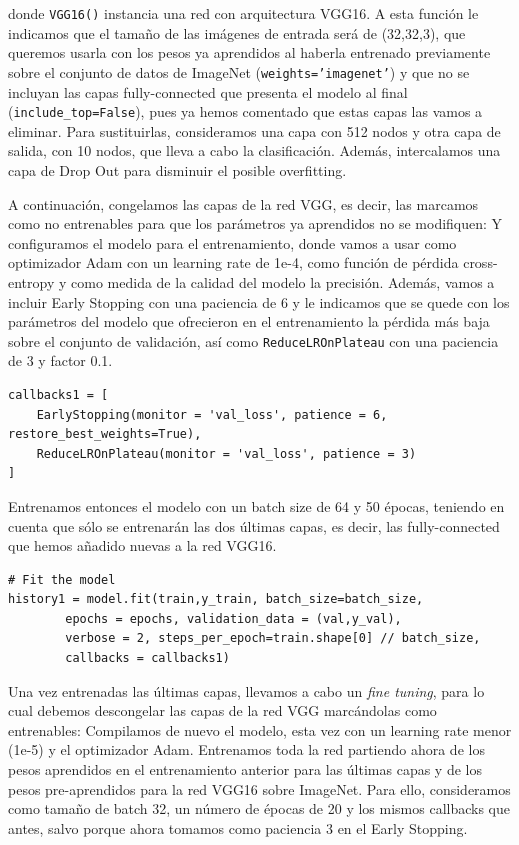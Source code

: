 \documentclass[a4paper,11pt]{article}
\begin{document}
donde \texttt{VGG16()} instancia una red con arquitectura VGG16. A esta función le indicamos que el tamaño de las imágenes de entrada será de (32,32,3), que queremos usarla con los pesos ya aprendidos al haberla entrenado previamente sobre el conjunto de datos de ImageNet (\texttt{weights='imagenet'}) y que no se incluyan las capas fully-connected que presenta el modelo al final (\texttt{include_top=False}), pues ya hemos comentado que estas capas las vamos a eliminar. Para sustituirlas, consideramos una capa con 512 nodos y otra capa de salida, con 10 nodos, que lleva a cabo la clasificación. Además, intercalamos una capa de Drop Out para disminuir el posible overfitting. 

A continuación, congelamos las capas de la red VGG, es decir, las marcamos como no entrenables para que los parámetros ya aprendidos no se modifiquen:
Y configuramos el modelo para el entrenamiento, donde vamos a usar como optimizador Adam con un learning rate de 1e-4, como función de pérdida cross-entropy y como medida de la calidad del modelo la precisión. Además, vamos a incluir Early Stopping con una paciencia de 6 y le indicamos que se quede con los parámetros del modelo que ofrecieron en el entrenamiento la pérdida más baja sobre el conjunto de validación, así como \texttt{ReduceLROnPlateau} con una paciencia de 3 y factor 0.1. 
\begin{verbatim}
callbacks1 = [ 
	EarlyStopping(monitor = 'val_loss', patience = 6, restore_best_weights=True), 
	ReduceLROnPlateau(monitor = 'val_loss', patience = 3)
]
\end{verbatim}

Entrenamos entonces el modelo con un batch size de 64 y 50 épocas, teniendo en cuenta que sólo se entrenarán las dos últimas capas, es decir, las fully-connected que hemos añadido nuevas a la red VGG16. 
\begin{verbatim}
# Fit the model
history1 = model.fit(train,y_train, batch_size=batch_size,
		epochs = epochs, validation_data = (val,y_val),
		verbose = 2, steps_per_epoch=train.shape[0] // batch_size,
		callbacks = callbacks1)
\end{verbatim}

Una vez entrenadas las últimas capas, llevamos a cabo un \textit{fine tuning}, para lo cual debemos descongelar las capas de la red VGG marcándolas como entrenables: 
Compilamos de nuevo el modelo, esta vez con un learning rate menor (1e-5) y el optimizador Adam. Entrenamos toda la red partiendo ahora de los pesos aprendidos en el entrenamiento anterior para las últimas capas y de los pesos pre-aprendidos para la red VGG16 sobre ImageNet. Para ello, consideramos como tamaño de batch 32, un número de épocas de 20 y los mismos callbacks que antes, salvo porque ahora tomamos como paciencia 3 en el Early Stopping. 
\end{document}
